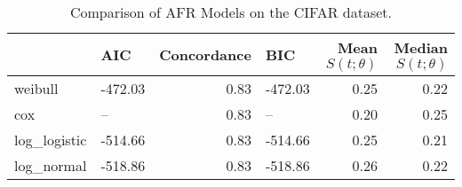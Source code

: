 \begin{table}
\caption{Comparison of AFR Models on the CIFAR dataset.}
\label{tab:cifar}
\begin{tabular}{llrlrr}
\toprule
 & AIC & Concordance & BIC & Mean $S(t;\theta)$ & Median $S(t;\theta)$ \\
\midrule
weibull & -472.03 & 0.83 & -472.03 & 0.25 & 0.22 \\
cox & -- & 0.83 & -- & 0.20 & 0.25 \\
log_logistic & -514.66 & 0.83 & -514.66 & 0.25 & 0.21 \\
log_normal & -518.86 & 0.83 & -518.86 & 0.26 & 0.22 \\
\bottomrule
\end{tabular}
\end{table}
